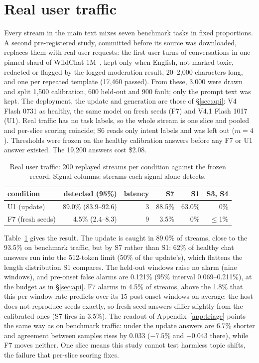 \documentclass[11pt]{article}
\begin{document}
\section{Real user traffic}
\label{app:chat}
Every stream in the main text mixes seven benchmark tasks in fixed proportions. A
second pre-registered study, committed before its source was downloaded, replaces
them with real user requests: the first user turns of conversations in one pinned
shard of WildChat-1M~\citep{zhao2024wildchat}, kept only when English, not marked
toxic, redacted or flagged by the logged moderation result, 20--2{,}000 characters
long, and one per repeated template (17{,}460 passed). From these, 3{,}000 were
drawn and split 1{,}500 calibration, 600 held-out and 900 fault; only the prompt
text was kept. The deployment, the update and generation are those of
\S\ref{sec:api}: V4 Flash 0731 as healthy, the same model on fresh seeds (F7) and
V4.1 Flash 1017 (U1). Real traffic has no task labels, so the whole stream is one
slice and pooled and per-slice scoring coincide; S6 reads only intent labels and
was left out ($m=4$). Thresholds were frozen on the healthy calibration answers
before any F7 or U1 answer existed. The 19{,}200 answers cost \$2.08.

\begin{table}[h]
  \centering\small
  \caption{Real user traffic: 200 replayed streams per condition against the
  frozen record. Signal columns: streams each signal alone detects.}
  \label{tab:chat}
  \begin{tabular}{lrrrrr}
    \toprule
    condition & detected (95\%) & latency & S7 & S1 & S3, S4 \\
    \midrule
    U1 (update) & 89.0\% (83.9--92.6) & 3 & 88.5\% & 63.0\% & 0\% \\
    F7 (fresh seeds) & 4.5\% (2.4--8.3) & 9 & 3.5\% & 0\% & $\le$1\% \\
    \bottomrule
  \end{tabular}
\end{table}

Table~\ref{tab:chat} gives the result. The update is caught in 89.0\% of streams,
close to the 93.5\% on benchmark traffic, but by S7 rather than S1: 62\% of healthy
chat answers run into the 512-token limit (50\% of the update's), which flattens the
length distribution S1 compares. The held-out windows raise no alarm (nine windows),
and pre-onset false alarms are 0.121\% (95\% interval 0.069--0.211\%), at the
budget as in \S\ref{sec:api}. F7 alarms in 4.5\% of streams, above the 1.8\% that this per-window rate predicts
over its 15 post-onset windows on average: the host does not reproduce seeds
exactly, so fresh-seed answers differ slightly from the calibrated ones (S7 fires
in 3.5\%). The readout of
Appendix~\ref{app:triage} points the same way as on benchmark traffic: under the
update answers are 6.7\% shorter and agreement between samples rises by 0.033
($-7.5\%$ and $+0.043$ there), while F7 moves neither. One slice means this study
cannot test harmless topic shifts, the failure that per-slice scoring fixes.
\end{document}
